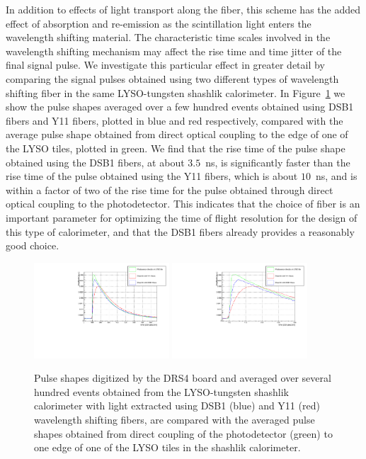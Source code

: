 \documentclass[11pt]{article}
\begin{document}
{In addition to effects of light transport along the fiber, 
this scheme has the added effect of absorption and re-emission as 
the scintillation light enters the wavelength shifting material. 
The characteristic time scales involved in the wavelength shifting 
mechanism may affect the rise time and time jitter of the final signal 
pulse. We investigate this particular effect in greater detail by
comparing the signal pulses obtained using two different types
of wavelength shifting fiber in the same LYSO-tungsten shashlik
calorimeter. In Figure~\ref{fig:FiberPulseComparison} we show
the pulse shapes averaged over a few hundred events obtained 
using DSB1 fibers and Y11 fibers, plotted in blue and red respectively,
compared with the average pulse shape obtained from direct optical 
coupling to the edge of one of the LYSO tiles, plotted in green.
We find that the rise time of the pulse shape obtained using the 
DSB1 fibers, at about $3.5$~ns, is significantly faster than the rise time
of the pulse obtained using the Y11 fibers, which is about $10$~ns,
and is within a factor of two of the rise time for the pulse obtained 
through direct optical coupling to the photodetector. This indicates
that the choice of fiber is an important parameter for 
optimizing the time of flight resolution for the design of 
this type of calorimeter, and that the DSB1 fibers 
already provides a reasonably good choice.

\begin{figure}[h] \centering
\includegraphics[width=0.45\textwidth]{figs/FiberPulses} 
\includegraphics[width=0.45\textwidth]{figs/FiberPulsesZoom} 
\caption{ Pulse shapes digitized by the DRS4 board and averaged over several hundred events 
obtained from the LYSO-tungsten shashlik calorimeter with light extracted using
DSB1 (blue) and Y11 (red) wavelength shifting fibers, are compared with 
the averaged pulse shapes obtained from direct coupling of the photodetector (green)
to one edge of one of the LYSO tiles in the shashlik calorimeter.} 
\label{fig:FiberPulseComparison}
\end{figure}


}
\end{document}
